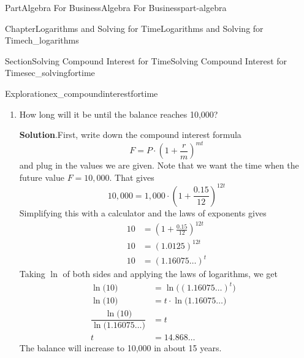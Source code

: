\documentclass[oneside,10pt,]{tufte-book}
\newcommand{\blocktitlefont}{\relax}
\numberwithin{equation}{chapter}
\newcommand{\amp}{&}
\begin{document}
\begin{partptx}{Part}{Algebra For Business}{}{Algebra For Business}{}{}{part-algebra}
\begin{chapterptx}{Chapter}{Logarithms and Solving for Time}{}{Logarithms and Solving for Time}{}{}{ch_logarithms}
\begin{sectionptx}{Section}{Solving Compound Interest for Time}{}{Solving Compound Interest for Time}{}{}{sec_solvingfortime}
\begin{exploration}{Exploration}{}{ex_compoundinterestfortime}
\begin{enumerate}[font=\bfseries,label=(\alph*),ref=\alph*]
\begin{align*}
2 = \amp \left(\ 1.16075\dots\ \right)^{t} \amp 
\end{align*}
%
\par
Finally, finish solving the exponential equation as above using the  \hyperref[assemblage-lawsoflogs]{Laws of Logs}.%
\begin{align*}
\ln\Big(2\Big) = \amp \ln\Big( \left(\ 1.16075\dots\ \right)^{t} \Big) \amp \\
\ln\Big(2\Big) = \amp t\cdot \ln\Big(  1.16075\dots \Big) \amp \qquad\text{Using }\ln(a^r) = r\ln(a)\\
t = \amp \dfrac{ \ln\Big(2\Big)}{\ln\Big(  1.16075\dots \Big) }\amp \qquad\text{Dividing both sides by }\ln\Big(  1.16075\dots \Big)\\
t = \amp 4.64\dots
\end{align*}
With 15\% interest, it will take about 4.64 years for the balance to double.%
\item{}How long will it be until the balance reaches \textdollar{}10,000?%
\par\smallskip%
\noindent\textbf{\blocktitlefont Solution}.\hypertarget{ex_compoundinterestfortime-3-2}{}\quad{}First, write down the compound interest formula%
\begin{equation*}
F = P\cdot \left(1 + \frac{r}{m}\right)^{mt}
\end{equation*}
and plug in the values we are given.  Note that we want the time when the future value \(F=10,000\).  That gives%
\begin{equation*}
10,000 = 1,000 \cdot (1 + \frac{0.15}{12})^{12t}
\end{equation*}
Simplifying this with a calculator and the laws of exponents gives%
\begin{align*}
10 \amp = (1 + \frac{0.15}{12})^{12t}\\
10 \amp = (1.0125 )^{12t}\\
10 \amp = (1.16075\dots )^{t}
\end{align*}
Taking \(\ln\) of both sides and applying the laws of logarithms, we get%
\begin{align*}
\ln\Big(10\Big) \amp = \ln\Big( (1.16075\dots )^{t} \Big)\\
\ln\Big(10\Big) \amp = t\cdot \ln\Big( 1.16075\dots  \Big)\\
\dfrac{\ln\Big(10\Big)}{\ln\Big( 1.16075\dots  \Big)} \amp = t  \\
t \amp = 14.868\dots \amp 
\end{align*}
The balance will increase to \textdollar{}10,000 in about 15 years.%

\end{enumerate}
\end{exploration}
\end{sectionptx}
\end{chapterptx}
\end{partptx}
\end{document}
